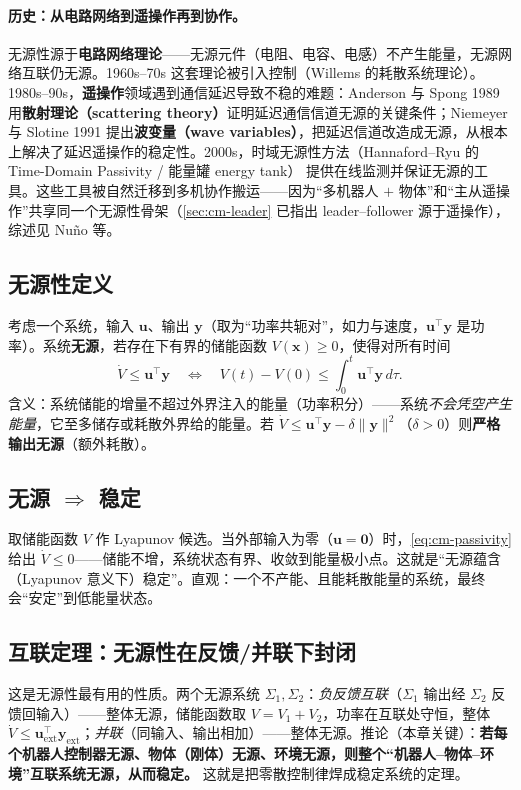 \paragraph{历史：从电路网络到遥操作再到协作。}
无源性源于\textbf{电路网络理论}——无源元件（电阻、电容、电感）不产生能量，无源网络互联仍无源。1960s--70s 这套理论被引入控制（Willems 的耗散系统理论）。1980s--90s，\textbf{遥操作}领域遇到通信延迟导致不稳的难题：Anderson 与 Spong 1989\cite{anderson1989bilateral} 用\textbf{散射理论（scattering theory）}证明延迟通信信道无源的关键条件；Niemeyer 与 Slotine 1991\cite{niemeyer1991stable} 提出\textbf{波变量（wave variables）}，把延迟信道改造成无源，从根本上解决了延迟遥操作的稳定性。2000s，时域无源性方法（Hannaford--Ryu 的 Time-Domain Passivity / 能量罐 energy tank）\cite{hannaford2002time} 提供在线监测并保证无源的工具。这些工具被自然迁移到多机协作搬运——因为“多机器人 $+$ 物体”和“主从遥操作”共享同一个无源性骨架（\cref{sec:cm-leader} 已指出 leader--follower 源于遥操作），综述见 Nu\~no 等\cite{nuno2011passivity}。

\subsection{无源性定义}
\label{sec:cm-passivity-def}
考虑一个系统，输入 $\mathbf{u}$、输出 $\mathbf{y}$（取为“功率共轭对”，如力与速度，$\mathbf{u}^\top\mathbf{y}$ 是功率）。系统\textbf{无源}，若存在下有界的储能函数 $V(\mathbf{x})\ge 0$，使得对所有时间
\begin{equation}
\boxed{\;\dot{V}\le\mathbf{u}^\top\mathbf{y}\quad\Longleftrightarrow\quad V(t)-V(0)\le\int_0^t\mathbf{u}^\top\mathbf{y}\,d\tau.\;}
  \label{eq:cm-passivity}
\end{equation}
含义：系统储能的增量不超过外界注入的能量（功率积分）——系统\emph{不会凭空产生能量}，它至多储存或耗散外界给的能量。若 $\dot V\le\mathbf{u}^\top\mathbf{y}-\delta\|\mathbf{y}\|^2$（$\delta>0$）则\textbf{严格输出无源}（额外耗散）。

\subsection{无源 \texorpdfstring{$\Rightarrow$}{=>} 稳定}
\label{sec:cm-passivity-stable}
取储能函数 $V$ 作 Lyapunov 候选。当外部输入为零（$\mathbf{u}=\mathbf{0}$）时，\cref{eq:cm-passivity} 给出 $\dot V\le 0$——储能不增，系统状态有界、收敛到能量极小点。这就是“无源蕴含（Lyapunov 意义下）稳定”。直观：一个不产能、且能耗散能量的系统，最终会“安定”到低能量状态。

\subsection{互联定理：无源性在反馈/并联下封闭}
\label{sec:cm-passivity-interconnect}
这是无源性最有用的性质。两个无源系统 $\Sigma_1,\Sigma_2$：\emph{负反馈互联}（$\Sigma_1$ 输出经 $\Sigma_2$ 反馈回输入）——整体无源，储能函数取 $V=V_1+V_2$，功率在互联处守恒，整体 $\dot V\le\mathbf{u}_{\text{ext}}^\top\mathbf{y}_{\text{ext}}$；\emph{并联}（同输入、输出相加）——整体无源。推论（本章关键）：\textbf{若每个机器人控制器无源、物体（刚体）无源、环境无源，则整个“机器人–物体–环境”互联系统无源，从而稳定。} 这就是把零散控制律焊成稳定系统的定理。

